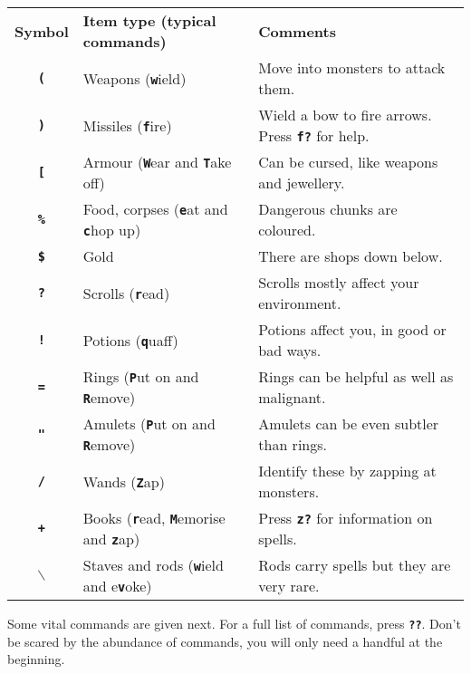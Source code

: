 \documentclass[a4paper,10pt]{article}
\newcommand{\key}[1]{{{\texttt{\textbf{#1}}}}} %
\newcommand{\sex}[1]{{{\textbf{#1}}}} %
\newcommand{\para}{\vspace{1.5ex}}
\begin{document}
\begin{tabular}{cll}
\sex{Symbol} & \sex{Item type (typical commands)} & \sex{Comments} \\
\key{(}  & Weapons (\key{w}ield)                  & Move into monsters to attack them.\\
\key{)}  & Missiles (\key{f}ire)                  & Wield a bow to fire arrows. Press \key{f?} for help.\\ 
\key{[}  & Armour (\key{W}ear and \key{T}ake off) & Can be cursed, like weapons and jewellery. \\
\key{\%} & Food, corpses (\key{e}at and \key{c}hop up) & Dangerous chunks are coloured. \\
\key{\$} & Gold                                   & There are shops down below. \\
\key{?}  & Scrolls (\key{r}ead)                   & Scrolls mostly affect your environment.\\
\key{!}  & Potions (\key{q}uaff)                  & Potions affect you, in good or bad ways. \\
\key{=}  & Rings (\key{P}ut on and \key{R}emove)  & Rings can be helpful as well as malignant. \\
\key{"}  & Amulets (\key{P}ut on and \key{R}emove) & Amulets can be even subtler than rings. \\
\key{/}  & Wands (\key{Z}ap)                      & Identify these by zapping at monsters. \\
\key{+}  & Books (\key{r}ead, \key{M}emorise and \key{z}ap) & Press \key{z?} for information on spells.\\
\key{$\backslash$} & Staves and rods (\key{w}ield and e\key{v}oke) \hspace{0.2em}
                                                  & Rods carry spells but they are very rare.
\end{tabular}

\para

Some vital commands are given next. For a full list of commands, press \key{??}.
Don't be scared by the abundance of commands, you will only need a handful at 
the beginning. 

\para
\end{document}
